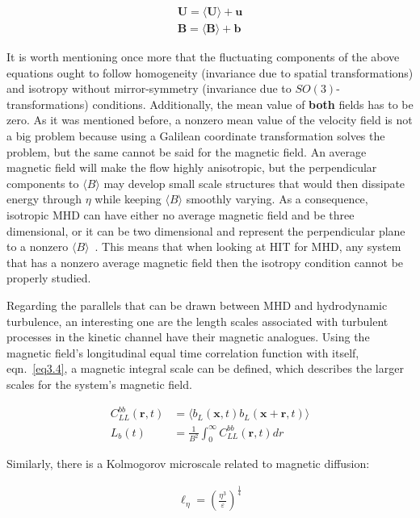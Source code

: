 \documentclass[12pt,a4paper]{report}
\begin{document}
\begin{align}
 \bm U = \langle \bm U \rangle + \bm u \nonumber \\
 \bm B = \langle \bm B \rangle + \bm b \nonumber
\end{align}

It is worth mentioning once more that the fluctuating components of the above equations ought to follow homogeneity (invariance due to spatial transformations) and isotropy without mirror-symmetry (invariance due to $SO(3)$-transformations) conditions. Additionally, the mean value of \textbf{both} fields has to be zero. As it was mentioned before, a nonzero mean value of the velocity field is not a big problem because using a Galilean coordinate transformation solves the problem, but the same cannot be said for the magnetic field. An average magnetic field will make the flow highly anisotropic, but the perpendicular components to $\langle B \rangle$ may develop small scale structures that would then dissipate energy through $\eta$ while keeping $\langle B \rangle$ smoothly varying. As a consequence, isotropic MHD can have either no average magnetic field and be three dimensional, or it can be two dimensional and represent the perpendicular plane to a nonzero $\langle B \rangle$~\cite{biskamp1997nonlinear}. This means that when looking at HIT for MHD, any system that has a nonzero average magnetic field then the isotropy condition cannot be properly studied. 

Regarding the parallels that can be drawn between MHD and hydrodynamic turbulence, an interesting one are the length scales associated with turbulent processes in the kinetic channel have their magnetic analogues. Using the magnetic field's longitudinal equal time correlation function with itself, eqn.~\ref{eq3.4}, a magnetic integral scale can be defined, which describes the larger scales for the system's magnetic field.

\begin{align}
 C_{LL}^{bb}(\bm r, t) &= \langle b_L(\bm x, t) b_L(\bm x + \bm r, t) \rangle \label{eq3.4} \\
 L_b(t) &= \frac{1}{B^2} \int_0^\infty C_{LL}^{bb}(\bm r, t) dr \nonumber
\end{align}

Similarly, there is a Kolmogorov microscale related to magnetic diffusion:

\begin{align}
 \ell_\eta = \left( \frac{\eta^3}{\varepsilon} \right)^{\frac{1}{4}} \nonumber
\end{align}
\end{document}
